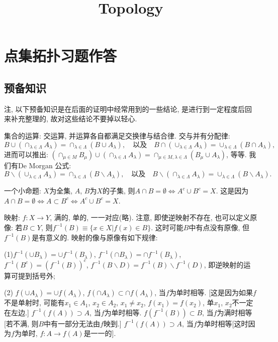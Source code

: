 \documentclass{ctexart}%
\theoremstyle{definition}
\theoremstyle{remark}
\begin{document}
 

\title{Topology}

\maketitle

\tableofcontents

\section{点集拓扑习题作答}


\subsection{预备知识}

注, 以下预备知识是在后面的证明中经常用到的一些结论, 是进行到一定程度后回来补充整理的, 故对这些结论不要掉以轻心. 

集合的运算: 交运算, 并运算各自都满足交换律与结合律. 交与并有分配律: $$B\cup(\cap_{\lambda\in \Lambda}
A_\lambda)=\cap_{\lambda\in \Lambda}(B\cup A_\lambda), \quad\text{以及}\quad B\cap(\cup_{\lambda\in \Lambda} A_\lambda)=\cup_{\lambda\in \Lambda}(B\cap A_\lambda),$$ 进而可以推出: $(\cap_{\mu\in M} B_\mu)\cup(\cap_{\lambda\in\Lambda} A_\lambda)=\cap_{\mu\in M, \lambda\in \Lambda} (B_\mu\cup A_\lambda)$, 等等.  我们有De Morgan 公式:
$$B\backslash (\cup_{\lambda\in \Lambda} A_\lambda)=\cap_{\lambda\in \Lambda} (B\backslash A_\lambda),
\quad \text{以及}\quad B\backslash (\cap_{\lambda\in \Lambda} A_\lambda)=\cup_{\lambda\in \Lambda}(B\backslash A_\lambda).$$

一个小命题: $X$为全集, $A$, $B$为$X$的子集, 则$A\cap B=\emptyset \Longleftrightarrow A^c\cup B^c= X$. 这是因为$A\cap B=\emptyset \Longleftrightarrow A\subset B^c \Longleftrightarrow A^c\cup B^c= X$. 

映射: $f:X\rightarrow Y$, 满的, 单的, 一一对应(略). 注意, 即使逆映射不存在, 也可以定义原像: 若$B\subset Y$, 则$f^{-1}(B)\equiv \{x\in X|f(x)\in B\}$. 这时可能$B$中有点没有原像, 但$f^{-1}(B)$是有意义的. 映射的像与原像有如下规律: 

(1)$f^{-1}(\cup B_\lambda)=\cup f^{-1}(B_\lambda)$, $f^{-1}(\cap B_\lambda)=\cap f^{-1}(B_\lambda)$, $f^{-1}(B^c)=(f^{-1}(B))^c$, $f^{-1}(B\backslash D)=f^{-1}(B)\backslash f^{-1}(D)$, 即逆映射的运算可提到括号外;

(2) $f(\cup A_\lambda)=\cup f(A_\lambda)$, $f(\cap A_\lambda)\subset \cap f(A_\lambda)$, 当$f$为单时相等. [这是因为如果$f$不是单射时, 可能有$x_1\in A_1$, $x_2\in A_2$, $x_1\neq x_2$, $f(x_1)=f(x_2)$, 单$x_1$, $x_2$不一定在左边.] $f^{-1}(f(A))\supset A$, 当$f$为单时相等. $f(f^{-1}(B))\subset B$, 当$f$为满时相等[若不满, 则$B$中有一部分无法由$f$映到.] $f^{-1}(f(A))\supset A$, 当$f$为单时相等[这时因为$f$为单时, $f: A\rightarrow f(A)$是一一的]. 
\end{document}
